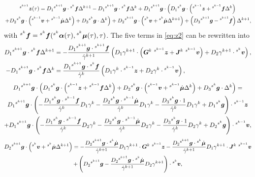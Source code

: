 \documentclass[../DC2017114Bouma.tex]{subfiles}
\begin{document}
\begin{multline}
\hspace{0cm}^{s^{k+1}}{\boldsymbol{z}}(\tau) = D_1\hspace{0cm}^{s^{k+1}}{\boldsymbol{g}}\cdot\hspace{0cm}^{s^{k}}{\boldsymbol{f}}\Delta^{k+1} - D_1\hspace{0cm}^{s^{k+1}}{\boldsymbol{g}}\cdot\hspace{0cm}^{s^{k}}{\boldsymbol{f}}\Delta^{k} + D_1\hspace{0cm}^{s^{k+1}}{\boldsymbol{g}}\cdot\left(D_1\hspace{0cm}^{s^{k}}{\boldsymbol{g}}\cdot\left(\hspace{0cm}^{s^{k-1}}{\boldsymbol{z}}+\hspace{0cm}^{s^{k-1}}{\boldsymbol{f}}\Delta^{k}\right)\right.\\
\left.+D_2\hspace{0cm}^{s^{k}}{\boldsymbol{g}}\cdot\left(\hspace{0cm}^{s^{k-1}}{\boldsymbol{v}}+\hspace{0cm}^{s^{k-1}}\dot{\boldsymbol{\mu}}\Delta^{k}\right)+D_3\hspace{0cm}^{s^{k}}{\boldsymbol{g}}\cdot\Delta^{k}\right) + D_2 \hspace{0cm}^{s^{k+1}}{\boldsymbol{g}}\cdot\left(\hspace{0cm}^{s^{k}}{\boldsymbol{v}}+\hspace{0cm}^{s^{k}}\dot{\boldsymbol{\mu}}\Delta^{k+1} \right) + \left(D_3\hspace{0cm}^{s^{k+1}}{\boldsymbol{g}} - \hspace{0cm}^{s^{k+1}}{\boldsymbol{f}}\right)\Delta^{k+1},\label{eq:z2}
\end{multline}
with $\hspace{0cm}^{s^k}{\boldsymbol{f}} = \hspace{0cm}^{s^k}{\boldsymbol{f}}(\hspace{0cm}^{s^k}\boldsymbol{\alpha}(\tau),\hspace{0cm}^{s^k}\boldsymbol{\mu}(\tau),\tau)$. The five terms in \eqref{eq:z2} can be rewritten into
\begin{align}
D_1\ls^{s^{k+1}}\gb\cdot\ls^{s^{k}}\fb\Delta^{k+1} &= -\frac{D_1\ls^{s^{k+1}}\gb\cdot\ls^{s^{k+1}}\fb}{\dot{\gamma}^{k+1}}\left(D_1\gamma^{k+1}\cdot\left(\Gb^{k}\ \ls^{s^{k-1}}\zb+\Jb^{k}\ \ls^{s^{k-1}}\vb\right) +D_2\gamma^{k+1}\cdot\ls^{s^{k}}\vb\right),\\
-D_1\ls^{s^{k+1}}\gb\cdot\ls^{s^{k}}\fb\Delta^{k} &= \frac{D_1\ls^{s^{k+1}}\gb\cdot\ls^{s^{k}}\fb}{\dot{\gamma}^{k}}\left(D_1\gamma^{k}\cdot\ls^{s^{k-1}}\zb + D_2\gamma^{k}\cdot\ls^{s^{k-1}}\vb\right),
\end{align}
\begin{multline}
D_1\hspace{0cm}^{s^{k+1}}{\boldsymbol{g}}\cdot\left(D_1\hspace{0cm}^{s^{k}}{\boldsymbol{g}}\cdot\left(\hspace{0cm}^{s^{k-1}}{\boldsymbol{z}} + \hspace{0cm}^{s^{k-1}}{\boldsymbol{f}}\Delta^{k}\right) + D_2\hspace{0cm}^{s^{k}}{\boldsymbol{g}}\cdot\left(\hspace{0cm}^{s^{k-1}}{\boldsymbol{v}}+\hspace{0cm}^{s^{k-1}}\dot{\boldsymbol{\mu}}\Delta^{k}\right) + D_3\hspace{0cm}^{s^{k}}{\boldsymbol{g}}\cdot\Delta^{k}\right) = \\
D_1\hspace{0cm}^{s^{k+1}}{\boldsymbol{g}}\cdot\left(-\frac{D_1\hspace{0cm}^{s^{k}}{\boldsymbol{g}}\cdot\hspace{0cm}^{s^{k-1}}{\boldsymbol{f}}}{\dot{\gamma}^{k}}D_1\gamma^{k} - \frac{D_2\hspace{0cm}^{s^{k}}{\boldsymbol{g}}\cdot\hspace{0cm}^{s^{k-1}}\dot{\boldsymbol{\mu}}}{\dot{\gamma}^{k}}D_1\gamma^{k} - \frac{D_3\hspace{0cm}^{s^{k}}{\boldsymbol{g}}\cdot 1}{\dot{\gamma}^{k}}D_1\gamma^{k} + D_1\hspace{0cm}^{s^{k}}{\boldsymbol{g}}\right)\cdot\hspace{0cm}^{s^{k-1}}{\boldsymbol{z}} \\
+ D_1\hspace{0cm}^{s^{k+1}}{\boldsymbol{g}}\cdot\left(-\frac{D_1\hspace{0cm}^{s^{k}}{\boldsymbol{g}}\cdot\hspace{0cm}^{s^{k-1}}{\boldsymbol{f}}}{\dot{\gamma}^{k}}D_2\gamma^{k} - \frac{D_2\hspace{0cm}^{s^{k}}{\boldsymbol{g}}\cdot\hspace{0cm}^{s^{k-1}}\dot{\boldsymbol{\mu}}}{\dot{\gamma}^{k}}D_2\gamma^{k} - \frac{D_3\hspace{0cm}^{s^{k}}{\boldsymbol{g}}\cdot 1}{\dot{\gamma}^{k}}D_2\gamma^{k} + D_2\hspace{0cm}^{s^{k}}{\boldsymbol{g}} \right)\cdot \hspace{0cm}^{s^{k-1}}{\boldsymbol{v}},
\end{multline}
\begin{multline}
D_2 \ls^{s^{k+1}}\gb\cdot\left(\ls^{s^{k}}\vb+\ls^{s^{k}}\dot{\mub}\Delta^{k+1} \right) = -\frac{D_2\ls^{s^{k+1}}\gb\cdot\ls^{s^k}\dot{\mub}}{\dot{\gamma}^{k+1}}D_1\gamma^{k+1}\cdot\Gb^k\ \ls^{s^{k-1}}\zb -\frac{D_2\ls^{s^{k+1}}\gb\cdot\ls^{s^k}\dot{\mub}}{\dot{\gamma}^{k+1}}D_1\gamma^{k+1}\cdot\Jb^k\ \ls^{s^{k-1}}\vb\\ + \left(D_2\ls^{s^{k+1}}\gb - \frac{D_2\ls^{s^{k+1}}\gb\cdot\ls^{s^k}\dot{\mub}}{\dot{\gamma}^{k+1}}D_2\gamma^{k+1}\right)\cdot\ls^{s^k}\vb,
\end{multline}
\end{document}
